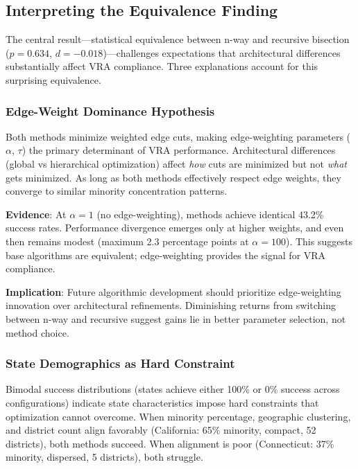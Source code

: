 \subsection{Interpreting the Equivalence Finding}

The central result—statistical equivalence between n-way and recursive bisection ($p=0.634$, $d=-0.018$)—challenges expectations that architectural differences substantially affect VRA compliance. Three explanations account for this surprising equivalence.

\subsubsection{Edge-Weight Dominance Hypothesis}

Both methods minimize weighted edge cuts, making edge-weighting parameters ($\alpha$, $\tau$) the primary determinant of VRA performance. Architectural differences (global vs hierarchical optimization) affect \textit{how} cuts are minimized but not \textit{what} gets minimized. As long as both methods effectively respect edge weights, they converge to similar minority concentration patterns.

\textbf{Evidence}: At $\alpha=1$ (no edge-weighting), methods achieve identical 43.2\% success rates. Performance divergence emerges only at higher weights, and even then remains modest (maximum 2.3 percentage points at $\alpha=100$). This suggests base algorithms are equivalent; edge-weighting provides the signal for VRA compliance.

\textbf{Implication}: Future algorithmic development should prioritize edge-weighting innovation over architectural refinements. Diminishing returns from switching between n-way and recursive suggest gains lie in better parameter selection, not method choice.

\subsubsection{State Demographics as Hard Constraint}

Bimodal success distributions (states achieve either 100\% or 0\% success across configurations) indicate state characteristics impose hard constraints that optimization cannot overcome. When minority percentage, geographic clustering, and district count align favorably (California: 65\% minority, compact, 52 districts), both methods succeed. When alignment is poor (Connecticut: 37\% minority, dispersed, 5 districts), both struggle.

